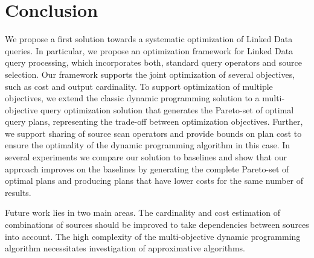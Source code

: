 \section{Conclusion}
\label{sec:conclusion}

We propose a first solution towards a systematic optimization of
Linked Data queries. In particular, we propose an optimization
framework for Linked Data query processing, which incorporates both,
standard query operators and source selection. Our framework supports
the joint optimization of several objectives, such as cost and output
cardinality. To support optimization of multiple objectives, we extend
the classic dynamic programming solution to a multi-objective query
optimization solution that generates the Pareto-set of optimal query
plans, representing the trade-off between optimization
objectives. Further, we support sharing of source scan operators and
provide bounds on plan cost to ensure the optimality of the dynamic
programming algorithm in this case. In several experiments we compare
our solution to baselines and show that our approach improves on the
baselines by generating the complete Pareto-set of optimal plans and
producing plans that have lower costs for the same number of results.

Future work lies in two main areas. The cardinality and cost
estimation of combinations of sources should be improved to take
dependencies between sources into account. The high complexity of the
multi-objective dynamic programming algorithm necessitates
investigation of approximative algorithms.

